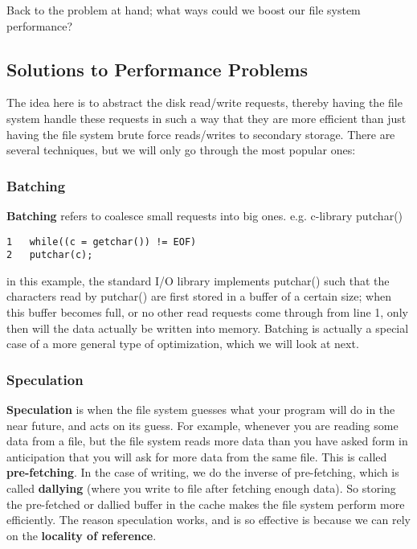 \documentclass[a4paper]{article}
\begin{document}
Back to the problem at hand; what ways could we boost our file system performance? 

\subsection{Solutions to Performance Problems}
The idea here is to abstract the disk read/write requests, thereby having the file system handle these requests in such a way that they are more efficient than just having the file system brute force reads/writes to secondary storage. There are several techniques, but we will only go through the most popular ones:
\subsubsection{Batching}
\textbf{Batching} refers to coalesce small requests into big ones. e.g. c-library putchar() 
\begin{lstlisting}
1   while((c = getchar()) != EOF)
2	putchar(c);
\end{lstlisting}
in this example, the standard I/O library implements putchar() such that the characters read by putchar() are first stored in a buffer of a certain size; when this buffer becomes full, or no other read requests come through from line 1, only then will the data actually be written into memory. Batching is actually a special case of a more general type of optimization, which we will look at next.
\subsubsection{Speculation} 
\textbf{Speculation} is when the file system guesses what your program will do in the near future, and acts on its guess. For example, whenever you are reading some data from a file, but the file system reads more data than you have asked form in anticipation that you will ask for more data from the same file. This is called \textbf{pre-fetching}. In the case of writing, we do the inverse of pre-fetching, which is called \textbf{dallying} (where you write to file after fetching enough data). So storing the pre-fetched or dallied buffer in the cache makes the file system perform more efficiently. The reason speculation works, and is so effective is because we can rely on the \textbf{locality of reference}. 
\end{document}
